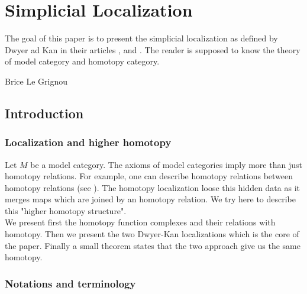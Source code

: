 \chapter{Simplicial Localization}

The goal of this paper is to present the simplicial localization as defined by Dwyer ad Kan in their articles \cite{dksimplicial}, \cite{dkcomputing} and \cite{dkfunction}. The reader is supposed to know the theory of model category and homotopy category.

\begin{flushright}
Brice Le Grignou
\end{flushright}

\section{Introduction}

\subsection{Localization and higher homotopy}

Let $M$ be a model category. The axioms of model categories imply more than just homotopy relations. For example, one can describe homotopy relations between homotopy relations (see \cite[2.3]{fromHAtoHAG}). The homotopy localization loose this hidden data as it merges maps which are joined by an homotopy relation. We try here to describe this "higher homotopy structure".\\

We present first the homotopy function complexes and their relations with homotopy. Then we present the two Dwyer-Kan localizations which is the core of the paper. Finally a small theorem states that the two approach give us the same homotopy.

\subsection{Notations and terminology}

